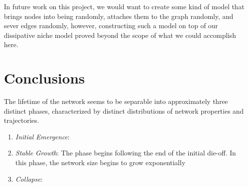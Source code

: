\documentclass{paper}
\begin{document}
	In future work on this project, we would want to create some kind of model that brings nodes into being randomly, attaches them to the graph randomly, and sever edges randomly, however, constructing such a model on top of our dissipative niche model proved beyond the scope of what we could accomplish here. 
	
	
	\section{Conclusions}
	
	The lifetime of the network seems to be separable into approximately three distinct phases, characterized by distinct distributions of network properties and trajectories. 
	\begin{enumerate}
		\item \textit{Initial Emergence}:
		\item \textit{Stable Growth}: The phase begins following the end of the initial die-off. In this phase, the network size begins to grow exponentially
		\item \textit{Collapse}:
	\end{enumerate}
	
	
	
\end{document}
